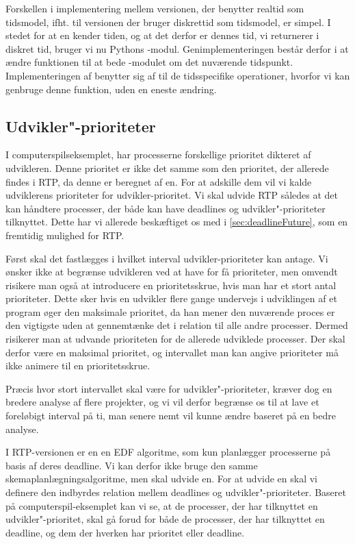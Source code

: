 Forskellen i implementering mellem versionen, der benytter realtid som tidsmodel, ifht. til versionen der bruger diskrettid som tidsmodel, er simpel. I stedet for at \sched en kender tiden, og at det derfor er dennes tid, vi returnerer i diskret tid, bruger vi nu Pythons -modul. Genimplementeringen består derfor  i at ændre funktionen  til at bede -modulet om det nuværende tidspunkt. Implementeringen af  benytter sig af  til de tidsspecifike operationer, hvorfor vi kan genbruge denne funktion, uden en eneste ændring. 

\subsection{Udvikler"-prioriteter}
I computerspilseksemplet, har processerne forskellige prioritet dikteret af udvikleren. Denne prioritet er ikke det samme som den prioritet, der allerede findes i RTP, da denne  er beregnet af \sched en. For at adskille dem vil vi kalde udviklerens prioriteter for udvikler-prioritet. Vi skal udvide RTP således at det kan håndtere processer, der både kan have deadlines og udvikler"-prioriteter tilknyttet. Dette har vi allerede beskæftiget os med i \cref{sec:deadlineFuture}, som en fremtidig mulighed for RTP. 

Først skal det fastlægges i hvilket interval udvikler-prioriteter kan antage. Vi ønsker ikke at begrænse udvikleren ved at have for få prioriteter, men omvendt risikere man også at introducere en prioritetsskrue, hvis man har et stort antal prioriteter. Dette sker hvis en udvikler flere gange undervejs i udviklingen af et program øger den maksimale prioritet, da han mener den nuværende proces er den vigtigste uden at gennemtænke det i relation til alle andre processer. Dermed risikerer man at udvande prioriteten for de allerede udviklede processer.  Der skal derfor være en maksimal prioritet, og intervallet man kan angive prioriteter må ikke animere til en prioritetsskrue.

Præcis  hvor stort intervallet skal være for udvikler"-prioriteter, kræver dog en bredere analyse af flere projekter, og vi vil derfor begrænse os til at lave et foreløbigt interval på ti, man senere nemt vil kunne ændre baseret på en bedre analyse.


I RTP-versionen er \sched en en EDF algoritme, som kun planlægger processerne på basis af deres deadline. Vi kan derfor ikke bruge den samme skemaplanlægningsalgoritme, men skal udvide \sched en. For at udvide \sched en skal vi definere den indbyrdes relation mellem deadlines og udvikler"-prioriteter. Baseret på computerspil-eksemplet kan vi se,  at de processer, der har  tilknyttet en udvikler"-prioritet, skal gå forud for både de processer, der har tilknyttet en deadline, og dem der hverken har prioritet eller deadline. 

